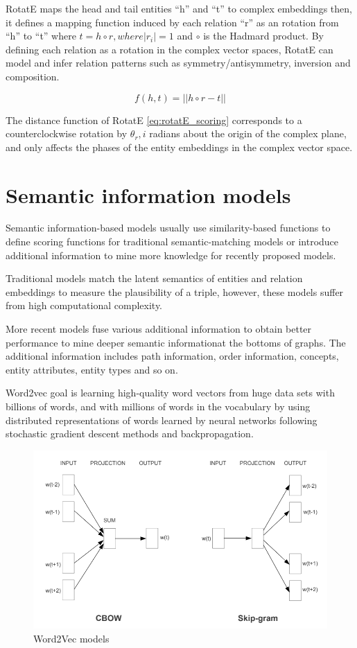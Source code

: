 RotatE maps the head and tail entities ``h'' and ``t'' to complex embeddings then, it defines a mapping function induced by each relation ``r'' as an rotation from ``h'' to ``t'' where $t = h \circ r, where |r_i| = 1$ and $\circ$ is the Hadmard product.
By defining each relation as a rotation in the complex vector spaces, RotatE can model and infer relation patterns such as symmetry/antisymmetry, inversion and composition. 

\begin{equation}
    \label{eq:rotatE_scoring}
    f(h, t) = ||h \circ r - t||
\end{equation}

The distance function of RotatE \ref{eq:rotatE_scoring} corresponds to a counterclockwise rotation by $\theta_r,i$ radians about the origin of the complex plane, and only affects the phases of the entity embeddings in the complex vector space.

\section{Semantic information models}\label{sec:emb-semantic}
Semantic information-based models usually use similarity-based functions to define scoring functions for traditional semantic-matching models or introduce additional information to mine more knowledge for recently proposed models.

Traditional models match the latent semantics of entities and relation embeddings to measure the plausibility of a triple, however, these models suffer from high computational complexity.

More recent models fuse various additional information to obtain better performance to mine deeper semantic informationat the bottoms of graphs. The additional information includes path information, order information, concepts, entity attributes, entity types and so on.

Word2vec\cite{} goal is learning high-quality word vectors from huge data sets with billions of words, and with millions of words in the vocabulary by using distributed representations of words learned by neural networks following stochastic gradient descent methods and backpropagation.

\begin{figure}[!htp]
    \centering
    \includegraphics[width=.75\textwidth]{fig/embeddings/Word2Vec.png}
    \caption{Word2Vec models}
    \label{fig:emb-rotatE}
\end{figure}

